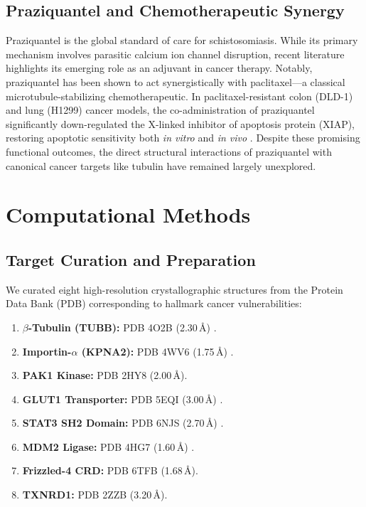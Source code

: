 \documentclass[10pt,a4paper,twocolumn]{article}
\begin{document}
\subsection{Praziquantel and Chemotherapeutic Synergy}
Praziquantel is the global standard of care for schistosomiasis. While its primary mechanism involves parasitic calcium ion channel disruption, recent literature highlights its emerging role as an adjuvant in cancer therapy. Notably, praziquantel has been shown to act synergistically with paclitaxel---a classical microtubule-stabilizing chemotherapeutic. In paclitaxel-resistant colon (DLD-1) and lung (H1299) cancer models, the co-administration of praziquantel significantly down-regulated the X-linked inhibitor of apoptosis protein (XIAP), restoring apoptotic sensitivity both \textit{in vitro} and \textit{in vivo} \cite{praziquantel_synergy}. Despite these promising functional outcomes, the direct structural interactions of praziquantel with canonical cancer targets like tubulin have remained largely unexplored.

\section{Computational Methods}

\subsection{Target Curation and Preparation}
We curated eight high-resolution crystallographic structures from the Protein Data Bank (PDB) corresponding to hallmark cancer vulnerabilities:
\begin{enumerate}
    \item \textbf{$\beta$-Tubulin (TUBB):} PDB 4O2B (2.30\,\AA) \cite{prota2014}.
    \item \textbf{Importin-$\alpha$ (KPNA2):} PDB 4WV6 (1.75\,\AA) \cite{pumroy2015}.
    \item \textbf{PAK1 Kinase:} PDB 2HY8 (2.00\,\AA).
    \item \textbf{GLUT1 Transporter:} PDB 5EQI (3.00\,\AA) \cite{deng2014}.
    \item \textbf{STAT3 SH2 Domain:} PDB 6NJS (2.70\,\AA) \cite{bai2019}.
    \item \textbf{MDM2 Ligase:} PDB 4HG7 (1.60\,\AA) \cite{sun2014}.
    \item \textbf{Frizzled-4 CRD:} PDB 6TFB (1.68\,\AA).
    \item \textbf{TXNRD1:} PDB 2ZZB (3.20\,\AA).
\end{enumerate}
\end{document}
